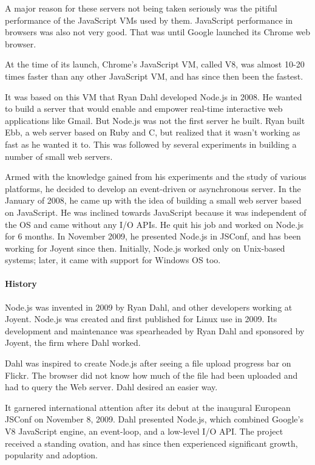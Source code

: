 A major reason for these servers not being taken seriously was the pitiful performance
of the JavaScript VMs used by them. JavaScript performance in browsers was also not
very good. That was until Google launched its Chrome web browser.\cite{16}

At the time of its launch, Chrome's JavaScript VM, called V8, was almost 10-20 times
faster than any other JavaScript VM, and has since then been the fastest.\cite{16}

It was based on this VM that Ryan Dahl developed Node.js in 2008. He wanted to
build a server that would enable and empower real-time interactive web applications
like Gmail. But Node.js was not the first server he built. Ryan built Ebb, a web server
based on Ruby and C, but realized that it wasn't working as fast as he wanted it to.
This was followed by several experiments in building a number of small web servers.\cite{16}

Armed with the knowledge gained from his experiments and the study of various
platforms, he decided to develop an event-driven or asynchronous server. In the
January of 2008, he came up with the idea of building a small web server based on
JavaScript. He was inclined towards JavaScript because it was independent of the
OS and came without any I/O APIs. He quit his job and worked on Node.js for 6
months. In November 2009, he presented Node.js in JSConf, and has been working
for Joyent since then. Initially, Node.js worked only on Unix-based systems; later, it
came with support for Windows OS too.\cite{16}

\paragraph*{History}
\hfill \break
Node.js was invented in 2009 by Ryan Dahl, and other developers working at Joyent. Node.js was created and first published for Linux use in 2009. Its development and maintenance was spearheaded by Ryan Dahl and sponsored by Joyent, the firm where Dahl worked.\cite{18}

Dahl was inspired to create Node.js after seeing a file upload progress bar on Flickr. The browser did not know how much of the file had been uploaded and had to query the Web server. Dahl desired an easier way.\cite{18}

It garnered international attention after its debut at the inaugural European JSConf on November 8, 2009. Dahl presented Node.js, which combined Google's V8 JavaScript engine, an event-loop, and a low-level I/O API. The project received a standing ovation, and has since then experienced significant growth, popularity and adoption.\cite{18}

